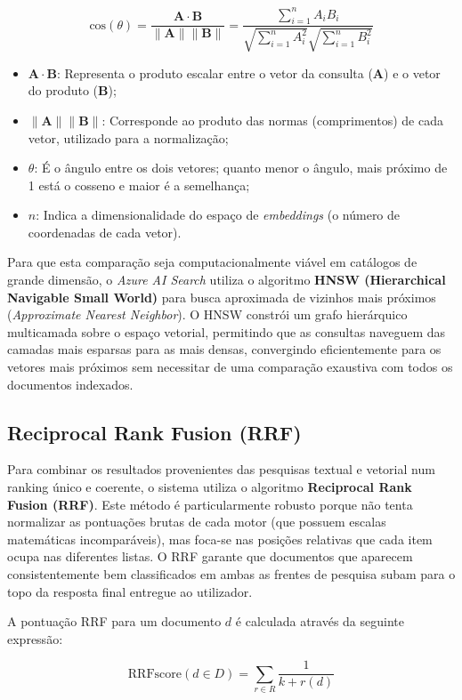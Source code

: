 \documentclass[runningheads]{llncs}
\begin{document}
$$\text{cos}(\theta) = \frac{\mathbf{A} \cdot \mathbf{B}}{\|\mathbf{A}\| \|\mathbf{B}\|} = \frac{\sum_{i=1}^{n} A_i B_i}{\sqrt{\sum_{i=1}^{n} A_i^2} \sqrt{\sum_{i=1}^{n} B_i^2}}$$

\begin{itemize}
\item $\mathbf{A} \cdot \mathbf{B}$: Representa o produto escalar entre o vetor da consulta ($\mathbf{A}$) e o vetor do produto ($\mathbf{B}$);
\item $\|\mathbf{A}\| \|\mathbf{B}\|$: Corresponde ao produto das normas (comprimentos) de cada vetor, utilizado para a normalização;
\item $\theta$: É o ângulo entre os dois vetores; quanto menor o ângulo, mais próximo de 1 está o cosseno e maior é a semelhança;
\item $n$: Indica a dimensionalidade do espaço de \textit{embeddings} (o número de coordenadas de cada vetor).
\end{itemize}

Para que esta comparação seja computacionalmente viável em catálogos de grande dimensão, o \textit{Azure AI Search} utiliza o algoritmo \textbf{HNSW (Hierarchical Navigable Small World)} para busca aproximada de vizinhos mais próximos (\textit{Approximate Nearest Neighbor}). O HNSW constrói um grafo hierárquico multicamada sobre o espaço vetorial, permitindo que as consultas naveguem das camadas mais esparsas para as mais densas, convergindo eficientemente para os vetores mais próximos sem necessitar de uma comparação exaustiva com todos os documentos indexados.

\subsection*{Reciprocal Rank Fusion (RRF)}
Para combinar os resultados provenientes das pesquisas textual e vetorial num ranking único e coerente, o sistema utiliza o algoritmo \textbf{Reciprocal Rank Fusion (RRF)}. Este método é particularmente robusto porque não tenta normalizar as pontuações brutas de cada motor (que possuem escalas matemáticas incomparáveis), mas foca-se nas posições relativas que cada item ocupa nas diferentes listas. O RRF garante que documentos que aparecem consistentemente bem classificados em ambas as frentes de pesquisa subam para o topo da resposta final entregue ao utilizador.

A pontuação RRF para um documento $d$ é calculada através da seguinte expressão:

$$\text{RRFscore}(d \in D) = \sum_{r \in R} \frac{1}{k + r(d)}$$
\end{document}
